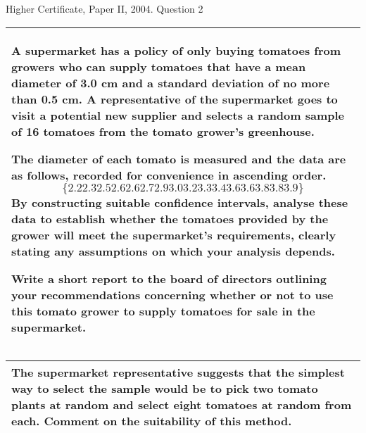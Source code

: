 \documentclass[a4paper,12pt]{article}
\begin{document}
Higher Certificate, Paper II, 2004. Question 2

 
\begin{table}[ht!]
 
\centering
 
\begin{tabular}{|p{15cm}|}
 
\hline  

A supermarket has a policy of only buying tomatoes from growers who can supply tomatoes that have a mean diameter of 3.0 cm and a standard 
deviation of no more than 0.5 cm.  A representative of the supermarket goes to visit a potential new supplier and selects a random sample of 
16 tomatoes from the tomato grower's greenhouse.  

The diameter of each tomato is measured and the data are as follows, recorded for convenience in ascending order. 
    \[\{2.2   2.3   2.5   2.6   2.6   2.7   2.9   3.0   3.2   3.3   3.4   3.6   3.6   3.8   3.8   3.9 \}\]
By constructing suitable confidence intervals, analyse these data to establish whether the tomatoes provided by the grower 
will meet the supermarket's requirements, clearly stating any assumptions on which your analysis depends.  


Write a short report to the board of directors outlining your recommendations concerning whether or not to use this 
tomato grower to supply tomatoes for sale in the supermarket.  
\\ \hline
  
\end{tabular}

\end{table} 
 
\begin{table}[ht!]
 
\centering
 
\begin{tabular}{|p{15cm}|}
 
\hline  



The supermarket representative suggests that the simplest way to select the sample would be to pick two tomato plants at random 
and select eight tomatoes at random from each.  Comment on the suitability of this method.  


\\ \hline
  
\end{tabular}

\end{table} 
\end{document}
